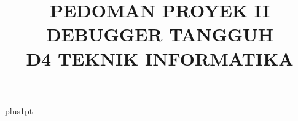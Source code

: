 \documentclass[12pt]{ociamthesis}  %
\title{ PEDOMAN	PROYEK	II \\
DEBUGGER TANGGUH \\
D4	TEKNIK	INFORMATIKA}   %
\author{}             %
\begin{document}
\baselineskip=18pt plus1pt

\setcounter{secnumdepth}{3}
\setcounter{tocdepth}{3}


\maketitle                  %

\begin{romanpages}          %
\tableofcontents            %
\end{romanpages}            %


 








\end{document}
